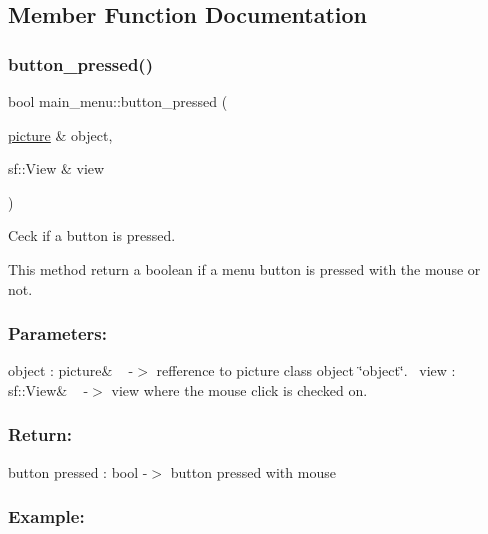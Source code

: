 \subsection{Member Function Documentation}
\mbox{\label{classmain__menu_a9314da13b6b8a7cd40dee3d45f029835}} 
\subsubsection{\texorpdfstring{button\+\_\+pressed()}{button\_pressed()}}
{\footnotesize\ttfamily bool main\+\_\+menu\+::button\+\_\+pressed (\begin{DoxyParamCaption}\item[{\hyperlink{classpicture}{picture} \&}]{object,  }\item[{sf\+::\+View \&}]{view }\end{DoxyParamCaption})}



Ceck if a button is pressed. 

This method return a boolean if a menu button is pressed with the mouse or not.~\newline


\subsubsection*{Parameters\+: }

object \+: picture\& ~\newline
-\/$>$ refference to picture class object \char`\"{}object\char`\"{}.~\newline
 view \+: sf\+::\+View\& ~\newline
-\/$>$ view where the mouse click is checked on.~\newline


\subsubsection*{Return\+: }

button pressed \+: bool -\/$>$ button pressed with mouse

\subsubsection*{Example\+: }


